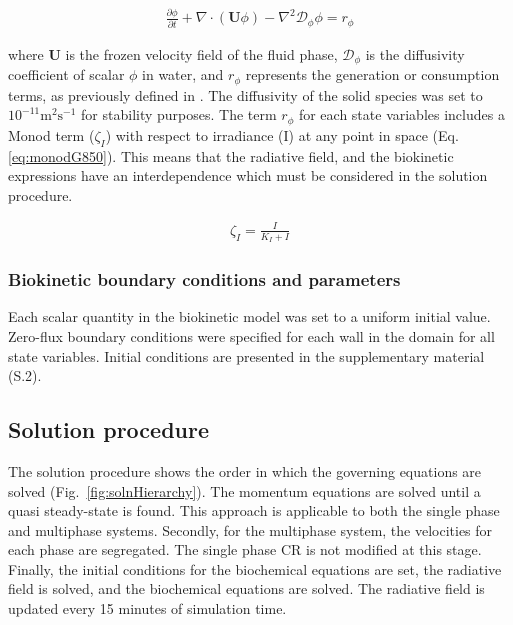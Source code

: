 \begin{align}
\frac{\partial \phi}{\partial t} + \nabla \cdot \left( \mathbf{U}\phi \right) - \nabla^2\mathcal{D}_\phi \phi = r_{\phi}
\end{align}

\noindent where $\mathbf{U}$ is the frozen velocity field of the fluid phase, $\mathcal{D}_{\phi}$ is the diffusivity coefficient of scalar $\phi$ in water, and $r_{\phi}$ represents the generation or consumption terms, as previously defined in \cite{Puyol2017}. The diffusivity of the solid species was set to $10^{-11} \mathrm{m^2 s^{-1}}$ for stability purposes.
\skippingparagraph
The term $r_\phi$ for each state variables includes a Monod term ($\zeta_I$) with respect to irradiance (I) at any point in space (Eq. \eqref{eq:monodG850}). This means that the radiative field, and the biokinetic expressions have an interdependence which must be considered in the solution procedure.

\begin{align}
\label{eq:monodG850}
\zeta_I = \frac{I}{K_I + I}
\end{align}

\subsubsection{Biokinetic boundary conditions and parameters}
Each scalar quantity in the biokinetic model was set to a uniform initial value. Zero-flux boundary conditions were specified for each wall in the domain for all state variables. Initial conditions are presented in the supplementary material (S.2).

\subsection{Solution procedure}
\label{ssec:soln}
The solution procedure shows the order in which the governing equations are solved (Fig.\ \ref{fig:solnHierarchy}). The momentum equations are solved until a quasi steady-state is found. This approach is applicable to both the single phase and multiphase systems. Secondly, for the multiphase system, the velocities for each phase are segregated. The single phase CR is not modified at this stage. Finally, the initial conditions for the biochemical equations are set, the radiative field is solved, and the biochemical equations are solved. The radiative field is updated every 15 minutes of simulation time.

